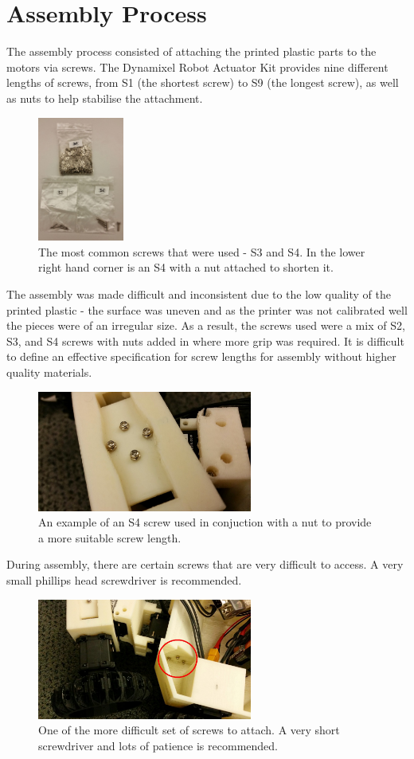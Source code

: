\documentclass[]{article}
\begin{document}
\section{Assembly Process}
The assembly process consisted of attaching the printed plastic parts to the motors via screws. The Dynamixel Robot Actuator Kit provides nine different lengths of screws, from S1 (the shortest screw) to S9 (the longest screw), as well as nuts to help stabilise the attachment.
\begin{figure}[H]
\centering
\includegraphics[width=80pt]{report_images/screws.jpg}
\caption{The most common screws that were used - S3 and S4. In the lower right hand corner is an S4 with a nut attached to shorten it.}
\end{figure}
The assembly was made difficult and inconsistent due to the low quality of the printed plastic - the surface was uneven and as the printer was not calibrated well the pieces were of an irregular size. As a result, the screws used were a mix of S2, S3, and S4 screws with nuts added in where more grip was required. It is difficult to define an effective specification for screw lengths for assembly without higher quality materials.
\begin{figure}[H]
\centering
\includegraphics[width=200pt]{report_images/screw_nut.jpg}
\caption{An example of an S4 screw used in conjuction with a nut to provide a more suitable screw length.}
\end{figure} 
During assembly, there are certain screws that are very difficult to access. A very small phillips head screwdriver is recommended.
\begin{figure}[H]
\centering
\includegraphics[width=200pt]{report_images/difficult_screw.jpg}
\caption{One of the more difficult set of screws to attach. A very short screwdriver and lots of patience is recommended.}
\end{figure}
\end{document}
